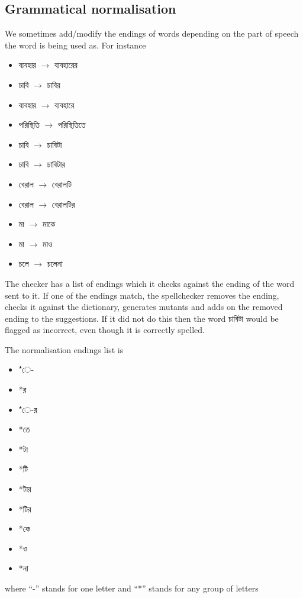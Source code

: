 \documentclass[11pt]{article}
\begin{document}
\subsection{Grammatical normalisation}
We sometimes add/modify the endings of words depending on the part of speech the word is being used as. For instance \begin{itemize}
\item {\lbng ব্যবহার} $\rightarrow$ {\lbng ব্যবহারের}
\item {\lbng চাবি} $\rightarrow$ {\lbng চাবির}
\item {\lbng ব্যবহার} $\rightarrow$ {\lbng ব্যবহারে}
\item {\lbng পরিস্থিতি} $\rightarrow$ {\lbng পরিস্থিতিতে}
\item {\lbng চাবি} $\rightarrow$ {\lbng চাবিটা}
\item {\lbng চাবি} $\rightarrow$ {\lbng চাবিটার}
\item {\lbng বেরাল} $\rightarrow$ {\lbng বেরালটি}
\item {\lbng বেরাল} $\rightarrow$ {\lbng বেরালটির}
\item {\lbng মা} $\rightarrow$ {\lbng মাকে}
\item {\lbng মা} $\rightarrow$ {\lbng মাও}
\item {\lbng চলে} $\rightarrow$ {\lbng চলেনা}
\end{itemize}
The checker has a list of endings which it checks against the ending of the word sent to it. If one of the endings match, the spellchecker removes the ending, checks it against the dictionary, generates mutants and adds on the removed ending to the suggestions. If it did not do this then the word {\bng চাবিটা} would be flagged as incorrect, even though it is correctly spelled.

The normalisation endings list is
{\lbng
\begin{itemize}
\item *ে-
\item *র
\item *ে-র
\item *তে
\item *টা
\item *টি
\item *টার
\item *টির
\item *কে
\item *ও
\item *না
\end{itemize}
}
where ``-'' stands for one letter and ``*'' stands for any group of letters
\end{document}
